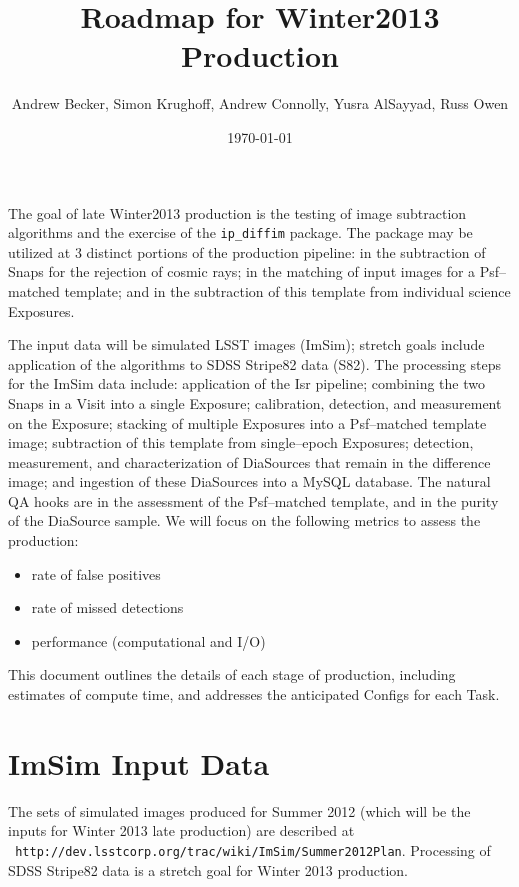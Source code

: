 \documentclass[12pt]{article}
\author{Andrew Becker, Simon Krughoff, Andrew Connolly, Yusra AlSayyad, Russ Owen}
\title{Roadmap for Winter2013 Production}
\date{\today}
\begin{document}
\maketitle

The goal of late Winter2013 production is the testing of image
subtraction algorithms and the exercise of the {\tt ip\_diffim}
package.  The package may be utilized at 3 distinct portions of the
production pipeline: in the subtraction of Snaps for the rejection of
cosmic rays; in the matching of input images for a Psf--matched
template; and in the subtraction of this template from individual
science Exposures.

The input data will be simulated LSST images (ImSim); stretch goals
include application of the algorithms to SDSS Stripe82 data (S82).
The processing steps for the ImSim data include: application of the
Isr pipeline; combining the two Snaps in a Visit into a single
Exposure; calibration, detection, and measurement on the Exposure;
stacking of multiple Exposures into a Psf--matched template image;
subtraction of this template from single--epoch Exposures; detection,
measurement, and characterization of DiaSources that remain in the
difference image; and ingestion of these DiaSources into a MySQL
database.  The natural QA hooks are in the assessment of the
Psf--matched template, and in the purity of the DiaSource sample.  We
will focus on the following metrics to assess the production:
\begin{itemize}
\item rate of false positives
\item rate of missed detections
\item performance (computational and I/O)
\end{itemize}
This document outlines the details of each stage of production,
including estimates of compute time, and addresses the anticipated
Configs for each Task.

\clearpage
\tableofcontents
\clearpage


\clearpage 
\section{ImSim Input Data} 

The sets of simulated images produced for Summer 2012 (which will be
the inputs for Winter 2013 late production) are described at \\{\tt
  http://dev.lsstcorp.org/trac/wiki/ImSim/Summer2012Plan}.  Processing
of SDSS Stripe82 data is a stretch goal for Winter 2013 production.
\end{document}
